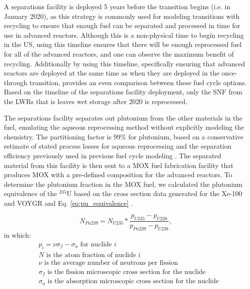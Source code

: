 A separations facility is deployed 5 years before the transition 
begins (i.e. in January 2020), as this strategy is commonly used for modeling 
transitions with recycling \cite{passerini_systematic_2014,richards_application_2021}
to ensure that enough fuel can be separated and 
processed in time for use in advanced reactors. Although this is a 
non-physical time to begin recycling in the US, using this timeline ensures 
that there will be enough reprocessed fuel for all of the advanced 
reactors, and one can observe the maximum benefit of recycling. Additionally 
by using this timeline, specifically ensuring that advanced reactors 
are deployed at the same time as when they are deployed in the once-through 
transition, provides an even comparison between these fuel cycle options.
Based on the timeline of the separations facility deployment, only the 
\gls{SNF} from the \glspl{LWR} that is leaves wet storage after 
2020 is reprocessed. 

The separations facility separates out plutonium from the other 
materials in the fuel, emulating the aqueous reprocessing method without 
explicitly modeling the chemistry. The partitioning factor is 99\% for
plutonium, based on a conservative estimate of stated 
process losses for aqueous reprocessing \cite{herbst_6_2011} and the 
separation efficiency previously used in previous fuel cycle modeling 
\cite{wigeland_nuclear_2014,sunny_transition_2015}. The separated 
material from this facility is then sent to a \gls{MOX} fuel fabrication 
facility that produces \gls{MOX} with a pre-defined composition for the 
advanced reactors. To determine the plutonium fraction in the 
\gls{MOX} fuel, we calculated the plutonium equivalence of the $^{235}$U 
based on the cross section data generated for the Xe-100 and VOYGR and 
Eq. \ref{eq:pu_equivalence} \cite{baker_comparison_1963}.

    \begin{equation}
        N_{Pu239} = N_{U235}*\frac{p_{U235} - p_{U238}}{p_{Pu239} - p_{U238}},
        \label{eq:pu_equivalence}
    \end{equation}
in which:
    \begin{align*}
        &p_i = \nu\sigma_f - \sigma_a \text{ for nuclide } i \\
        &N \text{ is the atom fraction of nuclide } i \\
        &\nu \text{ is the average number of neutrons per fission} \\
        &\sigma_f \text{ is the fission microscopic cross section for the nuclide} \\
        &\sigma_a \text{ is the absorption microscopic cross section for the nuclide} \\
    \end{align*}
    
